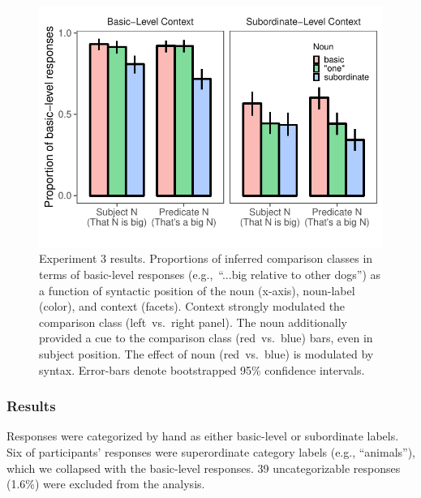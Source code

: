\documentclass[a4paper,man,natbib]{apa6}
\begin{document}
\begin{figure}[t]
	\begin{center}
		\includegraphics[width=\linewidth]{expt3-cc-inference-revised.pdf}
	\end{center}
	\vspace{-0.5cm}
	\caption{Experiment 3 results. Proportions of inferred comparison classes in terms of basic-level responses (e.g.,~“...big relative to other dogs”) as a function of syntactic position of the noun (x-axis), noun-label (color), and context (facets).
	Context strongly modulated the comparison class (left~vs.~right panel). 
	The noun additionally provided a cue to the comparison class (red~vs.~blue) bars, even in subject position. 
	The effect of noun (red~vs.~blue) is modulated by syntax. 
	Error-bars denote bootstrapped 95\% confidence intervals.
	}
	\vspace{-0.3cm}
	\label{cc-inference}
\end{figure}

\subsubsection{Results} 
Responses were categorized by hand as either basic-level or subordinate labels. 
Six of participants' responses were superordinate category labels (e.g., ``animals''), which we collapsed with the basic-level responses. 
39 uncategorizable responses (1.6\%) were excluded from the analysis. 
\end{document}
